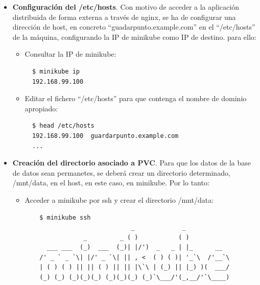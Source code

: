 \documentclass[12pt,spanish]{article}
\begin{document}
\begin{itemize}
\item{\textbf{Configuración del /etc/hosts}}. Con motivo de acceder a la aplicación distribuida de forma externa a través de nginx, se ha de configurar una dirección de host, en concreto ``guadarpunto.example.com'' en el ``/etc/hosts'' de la máquina, configurando la IP de minikube como IP de destino. para ello:
  \begin{itemize}
  \item{Consultar la IP de minikube}:
  \begin{verbatim}
  $ minikube ip
  192.168.99.100
  \end{verbatim}
  \item{Editar el fichero ``/etc/hosts'' para que contenga el nombre de dominio apropiado}:
  \begin{verbatim}
  $ head /etc/hosts
  192.168.99.100  guardarpunto.example.com
  ...
  \end{verbatim}
  \end{itemize}
\item{\textbf{Creación del directorio asociado a PVC}}. Para que los datos de la base de datos sean permanetes, se deberá crear un directorio determinado, /mnt/data, en el host, en este caso, en minikube. Por lo tanto:
  \begin{itemize}
  \item{Acceder a minikube por ssh y crear el directorio /mnt/data}:
  \begin{verbatim}
    $ minikube ssh
                             _             _
                _         _ ( )           ( )
      ___ ___  (_)  ___  (_)| |/')  _   _ | |_      __
    /' _ ` _ `\| |/' _ `\| || , <  ( ) ( )| '_`\  /'__`\
    | ( ) ( ) || || ( ) || || |\`\ | (_) || |_) )(  ___/
    (_) (_) (_)(_)(_) (_)(_)(_) (_)`\___/'(_,__/'`\____)


\end{verbatim}
\end{itemize}
\end{itemize}
\end{document}
